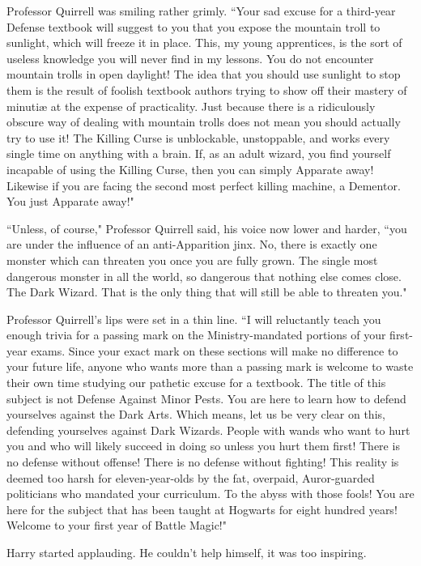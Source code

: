 Professor Quirrell was smiling rather grimly. ``Your sad excuse for a third-year Defense textbook will suggest to you that you expose the mountain troll to sunlight, which will freeze it in place. This, my young apprentices, is the sort of useless knowledge you will never find in my lessons. You do not encounter mountain trolls in open daylight! The idea that you should use sunlight to stop them is the result of foolish textbook authors trying to show off their mastery of minutiæ at the expense of practicality. Just because there is a ridiculously obscure way of dealing with mountain trolls does not mean you should actually try to use it! The Killing Curse is unblockable, unstoppable, and works every single time on anything with a brain. If, as an adult wizard, you find yourself incapable of using the Killing Curse, then you can simply Apparate away! Likewise if you are facing the second most perfect killing machine, a Dementor. You just Apparate away!"

``Unless, of course," Professor Quirrell said, his voice now lower and harder, ``you are under the influence of an anti-Apparition jinx. No, there is exactly one monster which can threaten you once you are fully grown. The single most dangerous monster in all the world, so dangerous that nothing else comes close. The Dark Wizard. That is the only thing that will still be able to threaten you."

Professor Quirrell's lips were set in a thin line. ``I will reluctantly teach you enough trivia for a passing mark on the Ministry-mandated portions of your first-year exams. Since your exact mark on these sections will make no difference to your future life, anyone who wants more than a passing mark is welcome to waste their own time studying our pathetic excuse for a textbook. The title of this subject is not Defense Against Minor Pests. You are here to learn how to defend yourselves against the Dark Arts. Which means, let us be very clear on this, defending yourselves against Dark Wizards. People with wands who want to hurt you and who will likely succeed in doing so unless you hurt them first! There is no defense without offense! There is no defense without fighting! This reality is deemed too harsh for eleven-year-olds by the fat, overpaid, Auror-guarded politicians who mandated your curriculum. To the abyss with those fools! You are here for the subject that has been taught at Hogwarts for eight hundred years! Welcome to your first year of Battle Magic!"

Harry started applauding. He couldn't help himself, it was too inspiring.

